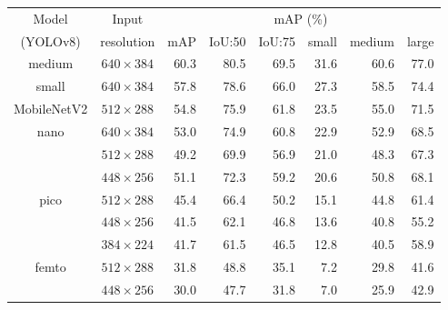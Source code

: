 \begin{table}[t]
    \centering
    \small
    \begin{threeparttable}
        \begin{tabular}{|c|c|rrrrrr|}
            \hline
            Model & Input & \multicolumn{6}{c|}{mAP (\%)} \\
            \cline{3-8}
            (YOLOv8)                     & resolution                       & mAP & IoU:50& IoU:75& small & medium& large \\
            \hline
            \hline
            \multirow{1}{*}{medium}      & \multirow{1}{*}{$640\times384$}  & 60.3 & 80.5 & 69.5 & 31.6 & 60.6 & 77.0 \\
            \hline                                                          
            \multirow{1}{*}{small}       & \multirow{1}{*}{$640\times384$}  & 57.8 & 78.6 & 66.0 & 27.3 & 58.5 & 74.4 \\
            \hline
            \multirow{1}{*}{MobileNetV2} & \multirow{1}{*}{$512\times288$}  & 54.8 & 75.9 & 61.8 & 23.5 & 55.0 & 71.5 \\
            \hline                      
            \multirow{3}{*}{nano}        & \multirow{1}{*}{$640\times384$}  & 53.0 & 74.9 & 60.8 & 22.9 & 52.9 & 68.5 \\
            \cline{2-2}
                                         & \multirow{1}{*}{$512\times288$}  & 49.2 & 69.9 & 56.9 & 21.0 & 48.3 & 67.3 \\
            \cline{2-2}
                                         & \multirow{1}{*}{$448\times256$}  & 51.1 & 72.3 & 59.2 & 20.6 & 50.8 & 68.1 \\
            \hline
            \multirow{3}{*}{pico}        & \multirow{1}{*}{$512\times288$}  & 45.4 & 66.4 & 50.2 & 15.1 & 44.8 & 61.4 \\
            \cline{2-2}
                                         & \multirow{1}{*}{$448\times256$}  & 41.5 & 62.1 & 46.8 & 13.6 & 40.8 & 55.2 \\
            \cline{2-2}
                                         & \multirow{1}{*}{$384\times224$}  & 41.7 & 61.5 & 46.5 & 12.8 & 40.5 & 58.9 \\
            \hline
            \multirow{4}{*}{femto}       & \multirow{1}{*}{$512\times288$}  & 31.8 & 48.8 & 35.1 &  7.2 & 29.8 & 41.6 \\
            \cline{2-2}
                                         & \multirow{1}{*}{$448\times256$}  & 30.0 & 47.7 & 31.8 &  7.0 & 25.9 & 42.9 \\

\end{tabular}
\end{threeparttable}
\end{table}
